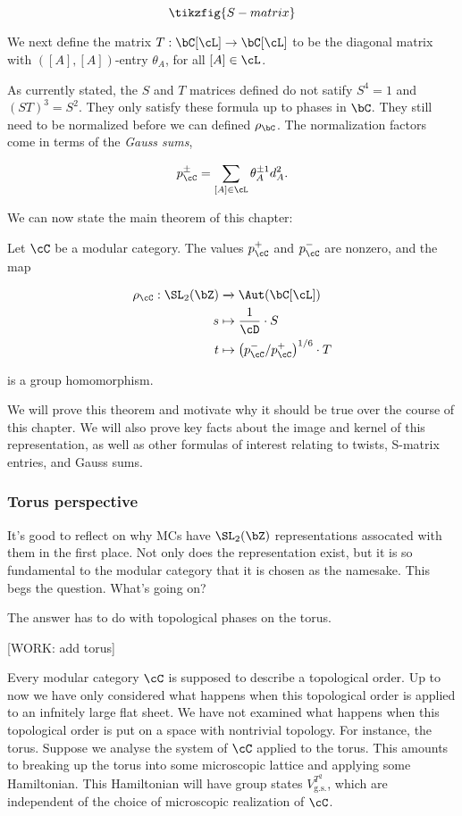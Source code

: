 \begin{equation*}
\tikzfig{S-matrix}
\end{equation*}

We next define the matrix $T:\bC[\cL]\to\bC[\cL]$ to be the diagonal matrix with $([A],[A])$-entry $\theta_{A}$, for all $[A]\in \cL$.

As currently stated, the $S$ and $T$ matrices defined do not satify $S^4=1$ and $(ST)^3=S^2$. They only satisfy these formula up to phases in $\bC$. They still need to be normalized before we can defined $\rho_{\bC}$. The normalization factors come in terms of the \textit{Gauss sums},

$$p^{\pm}_{\cC}=\sum_{[A]\in \cL}\theta_A^{\pm 1}d_A^2.$$

We can now state the main theorem of this chapter:

\begin{thrm} Let $\cC$ be a modular category. The values $p_{\cC}^{+}$ and $p_{\cC}^{-}$ are nonzero, and the map

\begin{align*}
\rho_{\cC}:\SL_2(\bZ)&\xrightarrow{}\Aut(\bC[\cL])\\
s & \mapsto \frac{1}{\cD}\cdot S\\ 
t & \mapsto \left(p_{\cC}^{-}/p_{\cC}^+\right)^{1/6}\cdot T
\end{align*}

is a group homomorphism.
\end{thrm}

We will prove this theorem and motivate why it should be true over the course of this chapter. We will also prove key facts about the image and kernel of this representation, as well as other formulas of interest relating to twists, S-matrix entries, and Gauss sums.

\subsubsection{Torus perspective}

It's good to reflect on why MCs have $\SL_2(\bZ)$ representations assocated with them in the first place. Not only does the representation exist, but it is so fundamental to the modular category that it is chosen as the namesake. This begs the question. What's going on?

The answer has to do with topological phases on the torus.

[WORK: add torus]

Every modular category $\cC$ is supposed to describe a topological order. Up to now we have only considered what happens when this topological order is applied to an infnitely large flat sheet. We have not examined what happens when this topological order is put on a space with nontrivial topology. For instance, the torus. Suppose we analyse the system of $\cC$ applied to the torus. This amounts to breaking up the torus into some microscopic lattice and applying some Hamiltonian. This Hamiltonian will have group states $V_{\text{g.s.}}^{T^2}$, which are independent of the choice of microscopic realization of $\cC$.

